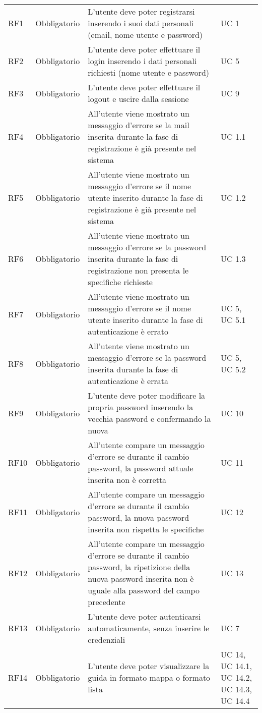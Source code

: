 {\begin{longtable}{C{.257\freewidth} C{.257\freewidth} C{.257\freewidth} C{.257\freewidth}}
      RF1 & Obbligatorio & L'utente deve poter registrarsi inserendo i suoi dati personali (email, nome utente e password) & UC 1 \\
      RF2 & Obbligatorio & L'utente deve poter effettuare il login inserendo i dati personali richiesti (nome utente e password) & UC 5 \\
      RF3 & Obbligatorio & L'utente deve poter effettuare il logout e uscire dalla sessione & UC 9 \\
      RF4 & Obbligatorio & All'utente viene mostrato un messaggio d'errore se la mail inserita durante la fase di registrazione è già presente nel sistema  & UC 1.1 \\
      RF5 & Obbligatorio & All'utente viene mostrato un messaggio d'errore se il nome utente inserito durante la fase di registrazione è già presente nel sistema & UC 1.2 \\
      RF6 & Obbligatorio & All'utente viene mostrato un messaggio d'errore se la password inserita durante la fase di registrazione non presenta le specifiche richieste & UC 1.3 \\
      RF7 & Obbligatorio & All'utente viene mostrato un messaggio d'errore se il nome utente inserito durante la fase di autenticazione è errato & UC 5, UC 5.1 \\
      RF8 & Obbligatorio & All'utente viene mostrato un messaggio d'errore se la password inserita durante la fase di autenticazione è errata & UC 5, UC 5.2 \\
      RF9 & Obbligatorio & L'utente deve poter modificare la propria password inserendo la vecchia password e confermando la nuova & UC 10 \\
      RF10 & Obbligatorio & All'utente compare un messaggio d'errore se durante il cambio password, la password attuale inserita non è corretta & UC 11 \\
      RF11 & Obbligatorio & All'utente compare un messaggio d'errore se durante il cambio password, la nuova password inserita non rispetta le specifiche & UC 12 \\
      RF12 & Obbligatorio & All'utente compare un messaggio d'errore se durante il cambio password, la ripetizione della nuova password inserita non è uguale alla password del campo precedente & UC 13 \\
      RF13 & Obbligatorio & L'utente deve poter autenticarsi automaticamente, senza inserire le credenziali & UC 7 \\
      RF14 & Obbligatorio & L'utente deve poter visualizzare la guida in formato mappa o formato lista & UC 14, UC 14.1, UC 14.2, UC 14.3, UC 14.4 \\

\end{longtable}}
